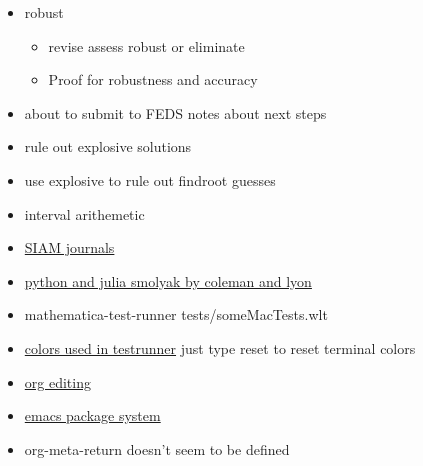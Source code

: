 \documentclass[hyperref]{labbook}
\begin{document}
\begin{itemize}
\item robust
  \begin{itemize}
\item {revise assess robust or eliminate}
\item Proof for robustness and accuracy 
  \end{itemize}
\end{itemize}




\begin{itemize}
\item about to submit to FEDS notes about next steps
\item rule out explosive solutions
\item use explosive to rule out findroot guesses
\end{itemize}


\begin{itemize}
\item interval arithemetic
\end{itemize}


\begin{itemize}
\item \href{https://www.siam.org/Publications/Journals}{SIAM journals}
\item \href{https://github.com/EconForge/Smolyak}{python and julia smolyak by coleman and lyon}
\end{itemize}







\begin{itemize}
\item mathematica-test-runner tests/someMacTests.wlt
\item \href{https://mathematica.stackexchange.com/questions/164468/wolframscript-how-to-print-in-color/164487#164487}{colors used in testrunner}  just type reset to reset terminal colors   
\end{itemize}


\begin{itemize}
\item \href{https://orgmode.org/manual/Structure-editing.html}{org editing}
\item \href{http://ergoemacs.org/emacs/emacs_package_system.html}{emacs package system}
\item org-meta-return doesn't seem to be defined
\end{itemize}
\end{document}
